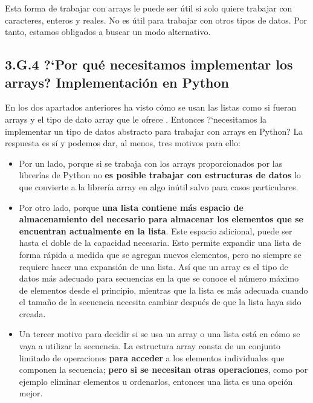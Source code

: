 Esta forma de trabajar con arrays le puede ser útil si solo quiere trabajar con caracteres, enteros y reales. No es útil para trabajar con otros tipos de datos. Por tanto, estamos obligados a buscar un modo alternativo.




\subsection*{3.G.4 ?`Por qué necesitamos implementar los arrays? Implementación en Python}

En los dos apartados anteriores ha visto cómo se usan las listas como si fueran arrays y el tipo de dato array que le ofrece . Entonces ?`necesitamos la  implementar un tipo de datos abstracto para trabajar con arrays en Python? La respuesta es sí y podemos dar, al menos, tres motivos para ello:

\begin{itemize}
\item Por un lado, porque si se trabaja con los arrays proporcionados por las librerías de Python no \textbf{es posible trabajar con estructuras de datos} lo que convierte a la librería array en algo inútil salvo para casos particulares. 

\item Por otro lado, porque \textbf{una lista contiene más espacio de almacenamiento del necesario para almacenar los elementos que se encuentran actualmente en la lista}. Este espacio adicional, puede ser hasta el doble de la capacidad necesaria. Esto permite expandir una lista de forma rápida a medida que se agregan nuevos elementos, pero no siempre se requiere hacer una expansión de una lista. Así que un array es el tipo de datos más adecuado para secuencias en la que se conoce el número máximo de elementos desde el principio, mientras que la lista es más adecuada cuando el tamaño de la secuencia necesita cambiar después de que la lista haya sido creada. 

\item Un tercer motivo para decidir si se usa un array o una lista está en cómo se vaya a utilizar la secuencia. La estructura array consta de un conjunto limitado de operaciones \textbf{para acceder} a los elementos individuales que componen la secuencia; \textbf{pero si se necesitan otras operaciones}, como por ejemplo eliminar elementos u ordenarlos, entonces una lista es una opción mejor.
\end{itemize}




